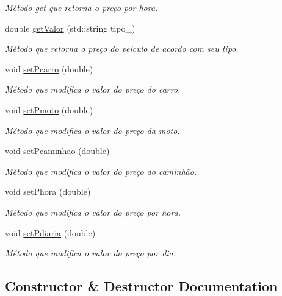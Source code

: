 \begin{DoxyCompactItemize}
\begin{DoxyCompactList}\small\item\em Método get que retorna o preço por hora. \end{DoxyCompactList}\item 
double \hyperlink{classTabela_ac49c8952230be93b59e99f4852b8fd06}{get\+Valor} (std\+::string tipo\+\_\+)
\begin{DoxyCompactList}\small\item\em Método que retorna o preço do veiculo de acordo com seu tipo. \end{DoxyCompactList}\item 
void \hyperlink{classTabela_a6b811be8b22906f261c7bfc93f39386b}{set\+Pcarro} (double)
\begin{DoxyCompactList}\small\item\em Método que modifica o valor do preço do carro. \end{DoxyCompactList}\item 
void \hyperlink{classTabela_af3cb0073ed37888bf632746a06f574d0}{set\+Pmoto} (double)
\begin{DoxyCompactList}\small\item\em Método que modifica o valor do preço da moto. \end{DoxyCompactList}\item 
void \hyperlink{classTabela_a668364c58c09fafd78e55039e4b28252}{set\+Pcaminhao} (double)
\begin{DoxyCompactList}\small\item\em Método que modifica o valor do preço do caminhão. \end{DoxyCompactList}\item 
void \hyperlink{classTabela_ac105d1c55278046beba287ab8d7d925d}{set\+Phora} (double)
\begin{DoxyCompactList}\small\item\em Método que modifica o valor do preço por hora. \end{DoxyCompactList}\item 
void \hyperlink{classTabela_aebcda3f64c04af31a5b2b247714234f5}{set\+Pdiaria} (double)
\begin{DoxyCompactList}\small\item\em Método que modifica o valor do preço por dia. \end{DoxyCompactList}\end{DoxyCompactItemize}


\subsection{Constructor \& Destructor Documentation}
\mbox{\label{classTabela_ae631691131af52919f4b2e8bb823fde6}} 
